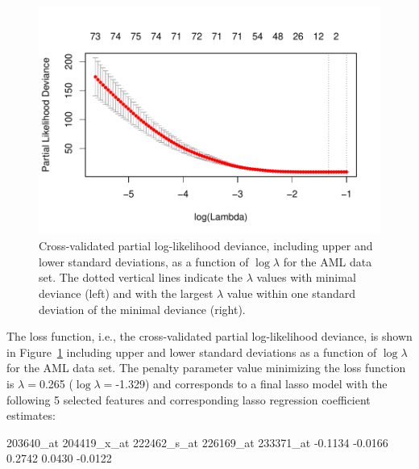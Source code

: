 \documentclass[nojss]{jss}
\begin{document}
\begin{figure}[H]
\begin{center}
\begin{Schunk}
\end{Schunk}
\includegraphics{c060_vignette-glmnet}
\end{center}
\caption{Cross-validated partial log-likelihood deviance, including upper and lower standard deviations, as a function of $\log{\lambda}$ for the AML data set. The dotted vertical lines indicate the $\lambda$ values with minimal deviance (left) and with the largest $\lambda$ value within one standard deviation of the minimal deviance (right).}
\label{fig:cvlasso}
\end{figure}

The loss function, i.e., the cross-validated partial log-likelihood deviance, is shown in Figure~\ref{fig:cvlasso} including upper and lower standard deviations as a function of $\log{\lambda}$ for the AML data set. The penalty parameter value minimizing the loss function is $\lambda =$0.265 ($\log\lambda =$-1.329) and corresponds to a final lasso model with the following 5 selected features and corresponding lasso regression coefficient estimates:
\begin{Schunk}
\begin{Soutput}
  203640_at 204419_x_at 222462_s_at   226169_at   233371_at 
    -0.1134     -0.0166      0.2742      0.0430     -0.0122 
\end{Soutput}
\end{Schunk}
\end{document}
